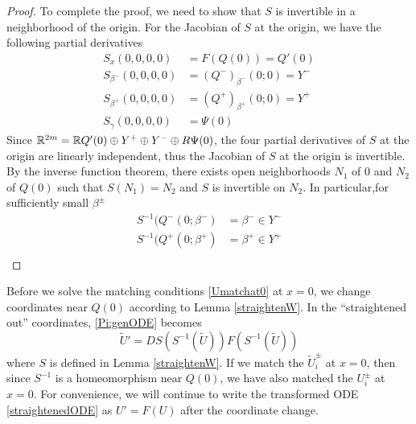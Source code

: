 \documentclass[thesis.tex]{subfiles}
\begin{document}
\begin{lemma}
\begin{proof}
To complete the proof, we need to show that $S$ is invertible in a neighborhood of the origin. For the Jacobian of $S$ at the origin, we have the following partial derivatives
\begin{align*}
S_x(0, 0, 0, 0) &= F(Q(0)) = Q'(0) \\
S_{\beta^-}(0, 0, 0, 0) &= (Q^-)_{\beta^-}(0; 0) = Y^- \\
S_{\beta^+}(0, 0, 0, 0) &= (Q^+)_{\beta^+}(0; 0) = Y^+ \\
S_{\gamma}(0, 0, 0, 0) &= \Psi(0)
\end{align*}
Since ${\mathbb R}^{2m} = {\mathbb R} Q'(0) \oplus Y^+ \oplus Y^- \oplus R \Psi(0)$, the four partial derivatives of $S$ at the origin are linearly independent, thus the Jacobian of $S$ at the origin is invertible. By the inverse function theorem, there exists open neighborhoods $N_1$ of 0 and $N_2$ of $Q(0)$ such that $S(N_1) = N_2$ and $S$ is invertible on $N_2$. In particular,for sufficiently small $\beta^\pm$
\begin{align*}
S^{-1}(Q^-(0; \beta^-) &= \beta^- \in Y^- \\
S^{-1}(Q^+(0; \beta^+) &= \beta^+ \in Y^+ \\
\end{align*}
\end{proof}
\end{lemma}

Before we solve the matching conditions \eqref{Umatchat0} at $x = 0$, we change coordinates near $Q(0)$ according to Lemma \ref{straightenW}. In the ``straightened out'' coordinates, \eqref{Pi:genODE} becomes
\begin{equation}\label{straightenedODE}
\tilde{U}' = DS(S^{-1}(\tilde{U})) F( S^{-1}(\tilde{U}) )
\end{equation}
where $S$ is defined in Lemma \ref{straightenW}. If we match the $\tilde{U}_i^\pm$ at $x = 0$, then since $S^{-1}$ is a homeomorphism near $Q(0)$, we have also matched the $U_i^\pm$ at $x = 0$. For convenience, we will continue to write the transformed ODE \eqref{straightenedODE} as $U' = F(U)$ after the coordinate change.
\end{document}
